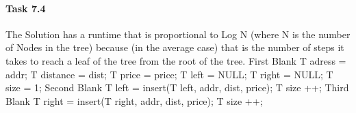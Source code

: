 \documentclass[11pt]{article}
\begin{document}
\paragraph{Task 7.4}
The Solution has a runtime that is proportional to Log N (where N is the number of Nodes in the tree) because (in the average case) that is the number of steps it takes to reach a leaf of the tree from the root of the tree. 
\newline First Blank 
\newline		 	   T \rightarrow adress = addr; 
\newline 			   T \rightarrow distance = dist;
\newline			   T \rightarrow price = price;
\newline 			   T \rightarrow left = NULL;
\newline			   T \rightarrow right = NULL;
\newline 			   T \rightarrow size = 1;
\newline
\newline Second Blank 
\newline		   	   T \rightarrow left = insert(T \rightarrow left, addr, dist, price);
\newline			   T \rightarrow size ++;
\newline
\newline Third Blank  
\newline		       T \rightarrow right = insert(T \rightarrow right, addr, dist, price);
\newline			   T \rightarrow size ++;
\end{document}
